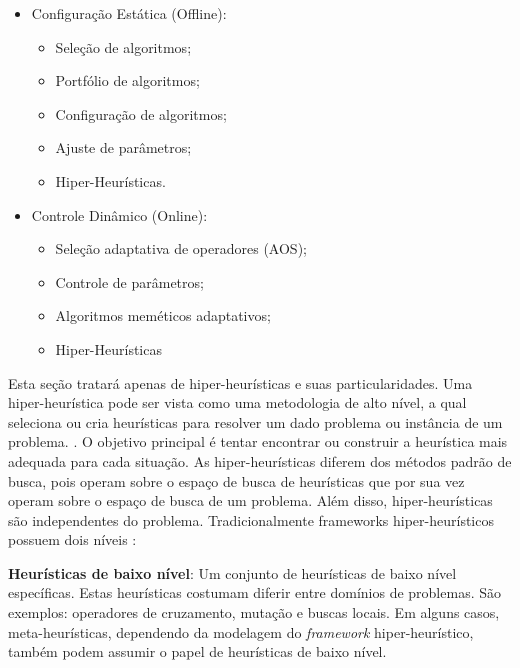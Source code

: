 \begin{itemize}
	\item Configuração Estática (Offline):
	\begin{itemize}
		\item Seleção de algoritmos;
		\item Portfólio de algoritmos;	
		\item Configuração de algoritmos;
		\item Ajuste de parâmetros;
		\item Hiper-Heurísticas.
	\end{itemize}
	\item Controle Dinâmico (Online):
	\begin{itemize}
		\item Seleção adaptativa de operadores (AOS);
		\item Controle de parâmetros;	
		\item Algoritmos meméticos adaptativos;
		\item Hiper-Heurísticas
	\end{itemize}
	
\end{itemize}


Esta seção tratará apenas de hiper-heurísticas e suas particularidades. Uma hiper-heurística pode ser vista como uma metodologia de alto nível, a qual seleciona ou cria heurísticas para resolver um dado problema ou instância de um problema. \cite{burke2013hyper}. O objetivo principal é tentar encontrar ou construir a heurística mais adequada para cada situação. As hiper-heurísticas diferem dos métodos padrão de busca, pois operam sobre o espaço de busca de heurísticas que por sua vez operam sobre o espaço de busca de um problema. Além disso, hiper-heurísticas são independentes do problema. Tradicionalmente frameworks hiper-heurísticos possuem dois níveis \cite{sabar2015automatic}: 

\textbf{Heurísticas de baixo nível}:  Um conjunto de heurísticas de baixo nível específicas. Estas heurísticas costumam diferir entre domínios de problemas. São exemplos: operadores de cruzamento, mutação e buscas locais. Em alguns casos, meta-heurísticas, dependendo da modelagem do \textit{framework} hiper-heurístico, também podem assumir o papel de heurísticas de baixo nível. 

